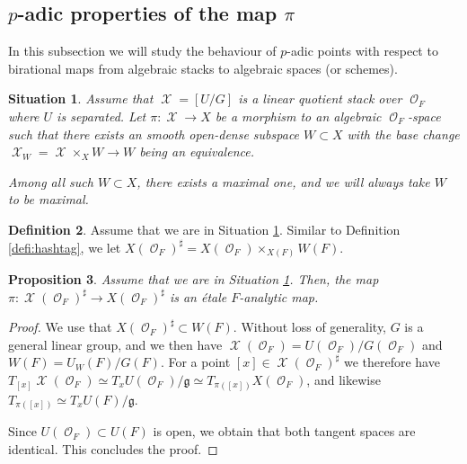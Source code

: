 \documentclass{article}
\DeclareMathOperator{\Xc}{\mathcal{X}}
\DeclareMathOperator{\Oc}{\mathcal{O}}
\theoremstyle{definition}
\newtheorem{definition}{Definition}[section]
\theoremstyle{plain}
\newtheorem{proposition}[definition]{Proposition}
\newtheorem{situation}[definition]{Situation}
\begin{document}
\subsection{$p$-adic properties of the map $\pi$}

In this subsection we will study the behaviour of $p$-adic points with respect to birational maps from algebraic stacks to algebraic spaces (or schemes).

\begin{situation}\label{sit:good}
Assume that $\Xc = [U/G]$ is a linear quotient stack over $\Oc_F$ where $U$ is separated. Let $\pi\colon \Xc \to X$ be a morphism to an algebraic $\Oc_F$-space such that there exists an smooth open-dense subspace $W \subset X$ with the base change $\Xc_W = \Xc \times_X W \to W$ being an equivalence. 

Among all such $W \subset X$, there exists a maximal one, and we will always take $W$ to be maximal.
\end{situation}

\begin{definition} Assume that we are in Situation \ref{sit:good}.  Similar to Definition \ref{defi:hashtag}, we let $X(\Oc_F)^{\sharp} = X(\Oc_F)\times_{X(F)} W(F)$.
\end{definition}

\begin{proposition}\label{prop:etale}
Assume that we are in Situation \ref{sit:good}. Then, the map 
$\pi\colon \Xc(\Oc_F)^{\sharp} \to X(\Oc_F)^{\sharp}$ is an \'etale $F$-analytic map. 
\end{proposition}
\begin{proof}
We use that $X(\Oc_F)^{\sharp} \subset W(F)$. Without loss of generality, $G$ is a general linear group, and we then have $\Xc(\Oc_F) = U(\Oc_F)/G(\Oc_F)$ and $W(F) = U_W(F)/G(F)$. For a point $[x] \in \Xc(\Oc_F)^{\sharp}$ we therefore have 
$T_{[x]}  \Xc(\Oc_F) \simeq T_x U(\Oc_F) / \mathfrak{g} \simeq T_{\pi([x])} X(\Oc_F)$, and likewise $T_{\pi([x])} \simeq T_x U(F) / \mathfrak{g}$.

Since $U(\Oc_F) \subset U(F)$ is open, we obtain that both tangent spaces are identical. This concludes the proof.
\end{proof}
\end{document}
